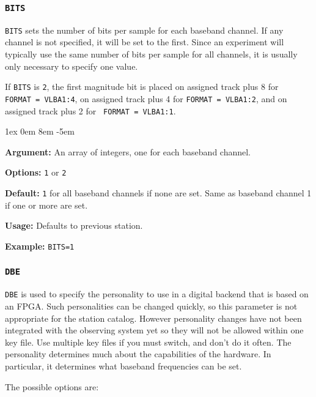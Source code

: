 \documentclass{report}
\newcommand{\rcwbox}[5]{
  \begin{list}{}{\parsep 1ex  \itemsep 0em
                 \leftmargin 8em  \itemindent -5em }
    \item {\bf Argument:} #1
    \item {\bf Options:}  #2
    \item {\bf Default:}  #3
    \item {\bf Usage:}    #4
    \item {\bf Example:}  #5
  \end{list}
}
\begin{document}
\subsubsection{\label{SP:BITS}{\tt BITS}}

{\tt BITS} sets the number of bits per sample for each baseband channel.
If any channel is not specified, it will be set to the first.  Since
an experiment will typically use the same number of bits per sample
for all channels, it is usually only necessary to specify one value.

If {\tt BITS} is {\tt 2}, the first magnitude bit is placed on assigned
track plus 8 for {\tt FORMAT~= VLBA1:4}, on assigned track plus 4 for
{\tt FORMAT~= VLBA1:2}, and on assigned track plus 2 for {\tt
FORMAT~= VLBA1:1}.

\rcwbox
{An array of integers, one for each baseband channel.}
{{\tt 1} or {\tt 2}}
{{\tt 1} for all baseband channels if none are set. Same as baseband
channel 1 if one or more are set.}
{Defaults to previous station.}
{{\tt BITS=1}}

\subsubsection{\label{SP:DBE}{\tt DBE}}

{\tt DBE} is used to specify the personality to use in a digital
backend that is based on an FPGA.  Such personalities can be changed
quickly, so this parameter is not appropriate for the station catalog.
However personality changes have not been integrated with the observing
system yet so they will not be allowed within one key file.  Use 
multiple key files if you must switch, and don't do it often.
The personality determines much about the capabilities of the hardware.
In particular, it determines what baseband frequencies can be set.

The possible options are:
\end{document}
